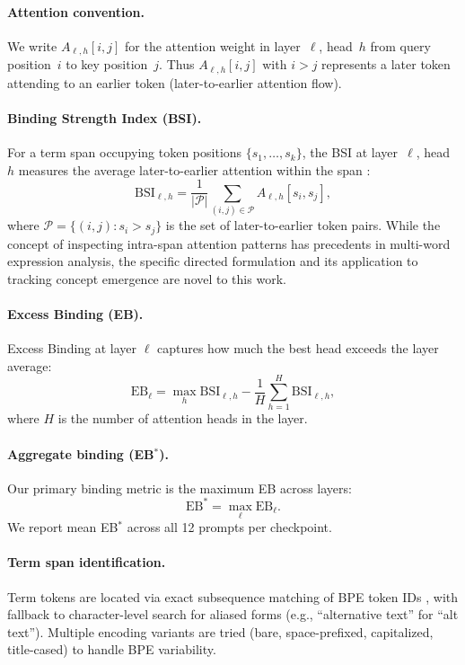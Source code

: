 \documentclass[10pt]{article} %
\begin{document}
\paragraph{Attention convention.}
We write $A_{\ell,h}[i,j]$ for the attention weight in layer~$\ell$, head~$h$ from query position~$i$ to key position~$j$.
Thus $A_{\ell,h}[i,j]$ with $i>j$ represents a later token attending to an earlier token (later-to-earlier attention flow).

\paragraph{Binding Strength Index (BSI).}
For a term span occupying token positions $\{s_1,\dots,s_k\}$, the BSI at layer~$\ell$, head~$h$ measures the average later-to-earlier attention within the span \citep{clark2019what,haviv2023understanding,miletic2024semantics}:
\[
\mathrm{BSI}_{\ell,h} = \frac{1}{|\mathcal{P}|} \sum_{(i,j)\in \mathcal{P}} A_{\ell,h}[s_i,s_j],
\]
where $\mathcal{P}=\{(i,j): s_i>s_j\}$ is the set of later-to-earlier token pairs.
While the concept of inspecting intra-span attention patterns has precedents in multi-word expression analysis, the specific directed formulation and its application to tracking concept emergence are novel to this work.

\paragraph{Excess Binding (EB).}
Excess Binding at layer $\ell$ captures how much the best head exceeds the layer average:
\[
\mathrm{EB}_{\ell} = \max_h \mathrm{BSI}_{\ell,h} - \frac{1}{H}\sum_{h=1}^{H} \mathrm{BSI}_{\ell,h},
\]
where $H$ is the number of attention heads in the layer.

\paragraph{Aggregate binding (EB$^*$).}
Our primary binding metric is the maximum EB across layers:
\[
\mathrm{EB}^* = \max_{\ell} \mathrm{EB}_{\ell}.
\]
We report mean EB$^*$ across all 12 prompts per checkpoint.

\paragraph{Term span identification.}
Term tokens are located via exact subsequence matching of BPE token IDs \citep{sennrich2016neural}, with fallback to character-level search for aliased forms (e.g., ``alternative text'' for ``alt text'').
Multiple encoding variants are tried (bare, space-prefixed, capitalized, title-cased) to handle BPE variability.
\end{document}
